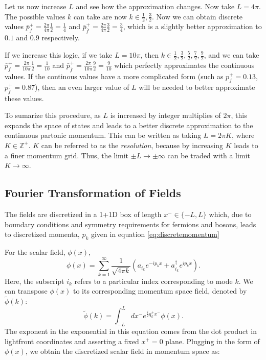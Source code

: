 Let us now increase $L$ and see how the approximation changes. 
Now take $L = 4\pi$. 
The possible values $k$ can take are now $k \in {\frac{1}{2}, \frac{3}{2}}$. 
Now we can obtain discrete values $\bar p_f^+ = \frac{2\pi}{4\pi}\frac{1}{2} = \frac{1}{4}$ and $\bar p_{\bar f}^+ = \frac{2\pi}{4\pi}\frac{3}{2} = \frac{3}{4}$, which is a slightly better approximation to $0.1$ and $0.9$ respectively. 

If we increase this logic, if we take $L = 10\pi$, then $k \in {\frac{1}{2}, \frac{3}{2}, \frac{5}{2}, \frac{7}{2}, \frac{9}{2}}$, and we can take $\bar p_f^+ = \frac{2\pi}{10\pi}\frac{1}{2} = \frac{1}{10}$ and $\bar p_{\bar f}^+ = \frac{2\pi}{10\pi}\frac{9}{2} = \frac{9}{10}$ which perfectly approximates the continuous values. 
If the continous values have a more complicated form (such as $p_f^+ = 0.13$, $p_{\bar f}^+ = 0.87$), then an even larger value of $L$ will be needed to better approximate these values. 

To sumarize this procedure, as $L$ is increased by integer multiplies of $2\pi$, this expands the space of states and leads to a better discrete approximation to the continuous partonic momentum. 
This can be written as taking $L = 2\pi K$, where $K \in \mathbb{Z}^+$. 
$K$ can be referred to as the \emph{resolution}, because by increasing $K$ leads to a finer momentum grid.
Thus, the limit $\pm L \rightarrow \pm \infty$ can be traded with a limit $K \rightarrow \infty$. 


\subsection{Fourier Transformation of Fields}

The fields are discretized in a 1+1D box of length $x^- \in \{-L, L\}$ which, due to boundary conditions and symmetry requirements for fermions and bosons, leads to discretized momenta, $p_k$ given in equation \ref{eq:discretemomentum}



For the scalar field, $\phi(x)$, $$\phi(x) = \sum_{k = 1}^\infty \frac{1}{\sqrt{4\pi k}}\left(a_{i_k} e^{-ip_k x} + a_{i_k}^\dagger e^{ip_k x} \right).$$
Here, the subscript $i_k$ refers to a particular index corresponding to mode $k$. 
We can transpose $\phi(x)$ to its corresponding momentum space field, denoted by $\tilde \phi(k)$: $$\tilde \phi(k) = \int_{-L}^L dx^- e^{\frac{i}{2}q_k^+ x^-}\phi(x).$$
The exponent in the exponential in this equation comes from the dot product in lightfront coordinates and asserting a fixed $x^+ = 0$ plane. 
Plugging in the form of $\phi(x)$, we obtain the discretized scalar field in momentum space as:

